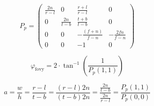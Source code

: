 \documentclass{minimal}
\begin{document}
\[
P_p = 
\begin{pmatrix}
\frac{2n}{r-l} & 0 & \frac{r+l}{r-l} & 0 \\
0 & \frac{2n}{t-b} & \frac{t+b}{t-b} & 0 \\
0 & 0 & -\frac{(f+n)}{f-n} & -\frac{2 f n}{f-n} \\
0 & 0 & -1 & 0
\end{pmatrix}
\]

\[
\varphi_{\textrm{fovy}} = 2 \cdot \tan^{-1}(\frac{1}{P_p(1,1)})
\]

\[
a = \frac{w}{h} = \frac{r-l}{t-b} = \frac{(r-l)2n}{(t-b)2n} = \frac{\frac{2n}{t-b}}{\frac{2n}{r-l}} = \frac{P_p(1,1)}{P_p(0,0)}
\]
\end{document}
